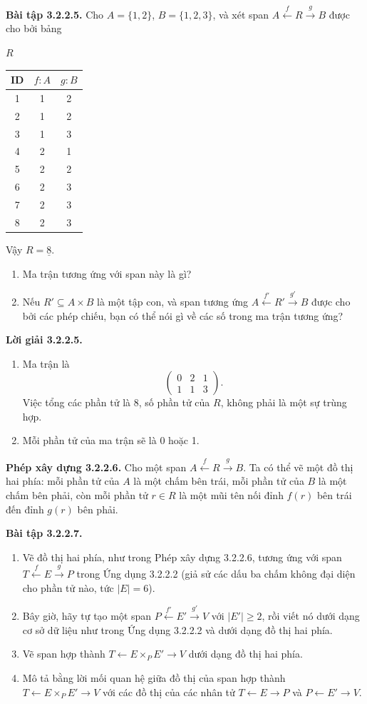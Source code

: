 \noindent\textbf{Bài tập 3.2.2.5.} Cho $A=\{1,2\}$, $B=\{1,2,3\}$, và xét span $A\xleftarrow{f}R\xrightarrow{g}B$ được cho bởi bảng
\begin{center}$R$\\\begin{tabular}{ccc}\toprule ID&$f:A$&$g:B$\\\midrule1&1&2\\2&1&2\\3&1&3\\4&2&1\\5&2&2\\6&2&3\\7&2&3\\8&2&3\\\bottomrule\end{tabular}\end{center}
Vậy $R=\underline{8}$.
\begin{enumerate}[label=\alph*.]
\item Ma trận tương ứng với span này là gì?
\item Nếu $R'\subseteq A\times B$ là một tập con, và span tương ứng $A\xleftarrow{f'}R'\xrightarrow{g'}B$ được cho bởi các phép chiếu, bạn có thể nói gì về các số trong ma trận tương ứng?
\end{enumerate}
\noindent\textbf{Lời giải 3.2.2.5.}\keepwithnext
\begin{enumerate}[label=\alph*.]
\item Ma trận là
\[\begin{pmatrix}0&2&1\\1&1&3\end{pmatrix}.\]
Việc tổng các phần tử là 8, số phần tử của $R$, không phải là một sự trùng hợp.
\item Mỗi phần tử của ma trận sẽ là 0 hoặc 1.
\end{enumerate}

\noindent\textbf{Phép xây dựng 3.2.2.6.} Cho một span $A\xleftarrow{f}R\xrightarrow{g}B$. Ta có thể vẽ một đồ thị hai phía: mỗi phần tử của $A$ là một chấm bên trái, mỗi phần tử của $B$ là một chấm bên phải, còn mỗi phần tử $r\in R$ là một mũi tên nối đỉnh $f(r)$ bên trái đến đỉnh $g(r)$ bên phải.

\noindent\textbf{Bài tập 3.2.2.7.}\keepwithnext
\begin{enumerate}[label=\alph*.]
\item Vẽ đồ thị hai phía, như trong Phép xây dựng 3.2.2.6, tương ứng với span $T\xleftarrow{f}E\xrightarrow{g}P$ trong Ứng dụng 3.2.2.2 (giả sử các dấu ba chấm không đại diện cho phần tử nào, tức $|E|=6$).
\item Bây giờ, hãy tự tạo một span $P\xleftarrow{f'}E'\xrightarrow{g'}V$ với $|E'|\ge2$, rồi viết nó dưới dạng cơ sở dữ liệu như trong Ứng dụng 3.2.2.2 và dưới dạng đồ thị hai phía.
\item Vẽ span hợp thành $T\leftarrow E\times_PE'\to V$ dưới dạng đồ thị hai phía.
\item Mô tả bằng lời mối quan hệ giữa đồ thị của span hợp thành $T\leftarrow E\times_PE'\to V$ với các đồ thị của các nhân tử $T\leftarrow E\to P$ và $P\leftarrow E'\to V$.
\end{enumerate}

